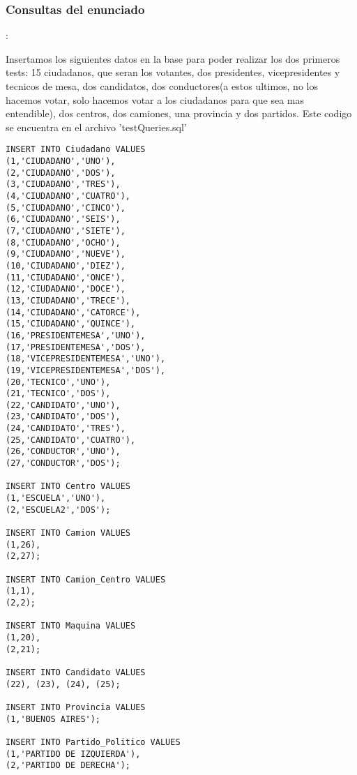 \subsubsection{Consultas del enunciado}:

Insertamos los siguientes datos en la base para poder realizar los dos primeros tests: 15 ciudadanos, que seran los votantes, dos presidentes, vicepresidentes y tecnicos de mesa, dos candidatos, dos conductores(a estos ultimos, no los hacemos votar, solo hacemos votar a los ciudadanos para que sea mas entendible), dos centros, dos camiones, una provincia y dos partidos. Este codigo se encuentra en el archivo 'testQueries.sql'

\begin{lstlisting}
INSERT INTO Ciudadano VALUES
(1,'CIUDADANO','UNO'),
(2,'CIUDADANO','DOS'),
(3,'CIUDADANO','TRES'),
(4,'CIUDADANO','CUATRO'),
(5,'CIUDADANO','CINCO'),
(6,'CIUDADANO','SEIS'),
(7,'CIUDADANO','SIETE'),
(8,'CIUDADANO','OCHO'),
(9,'CIUDADANO','NUEVE'),
(10,'CIUDADANO','DIEZ'),
(11,'CIUDADANO','ONCE'),
(12,'CIUDADANO','DOCE'),
(13,'CIUDADANO','TRECE'),
(14,'CIUDADANO','CATORCE'),
(15,'CIUDADANO','QUINCE'),
(16,'PRESIDENTEMESA','UNO'),
(17,'PRESIDENTEMESA','DOS'),
(18,'VICEPRESIDENTEMESA','UNO'),
(19,'VICEPRESIDENTEMESA','DOS'),
(20,'TECNICO','UNO'),
(21,'TECNICO','DOS'),
(22,'CANDIDATO','UNO'),
(23,'CANDIDATO','DOS'),
(24,'CANDIDATO','TRES'),
(25,'CANDIDATO','CUATRO'),
(26,'CONDUCTOR','UNO'),
(27,'CONDUCTOR','DOS');

INSERT INTO Centro VALUES
(1,'ESCUELA','UNO'),
(2,'ESCUELA2','DOS');

INSERT INTO Camion VALUES
(1,26),
(2,27);

INSERT INTO Camion_Centro VALUES
(1,1),
(2,2);

INSERT INTO Maquina VALUES
(1,20),
(2,21);

INSERT INTO Candidato VALUES
(22), (23), (24), (25);

INSERT INTO Provincia VALUES
(1,'BUENOS AIRES');

INSERT INTO Partido_Politico VALUES
(1,'PARTIDO DE IZQUIERDA'),
(2,'PARTIDO DE DERECHA');


\end{lstlisting}

